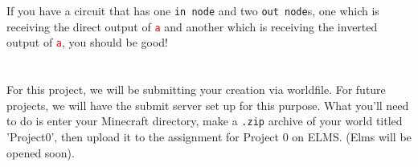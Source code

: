 \documentclass{article}
\begin{document}
If you have a circuit that has one \texttt{in node} and two \texttt{out node}s, one which is receiving the direct output of \textcolor{red}{\texttt{a}} and another which is receiving the inverted output of \textcolor{red}{\texttt{a}}, you should be good!
        
    \section{\selectfont{Submission}}
    
        \par For this project, we will be submitting your creation via worldfile. For future projects, we will have the submit server set up for this purpose. What you'll need to do is enter your Minecraft directory, make a \texttt{.zip} archive of your world titled 'Project0', then upload it to the assignment for Project 0 on ELMS. (Elms will be opened soon).
        
\end{document}

